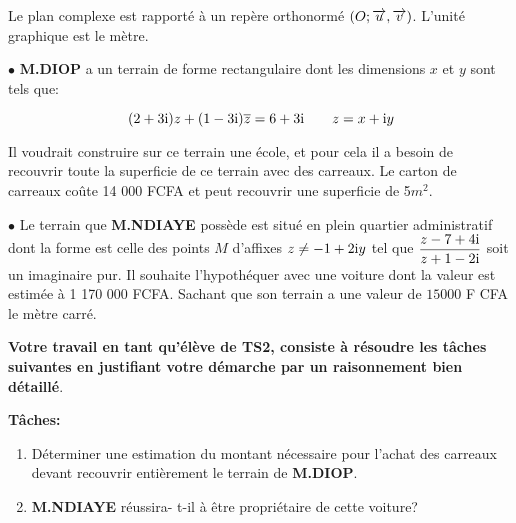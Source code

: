\begin{exercice}
Le plan complexe est rapporté à un repère  orthonormé $ (O ;\overrightarrow{u},\overrightarrow{v}) $. L'unité graphique est le mètre.
\medskip

$ \bullet $  \textbf{M.DIOP} a un terrain de forme rectangulaire  dont les dimensions $x$ et $y$ sont tels que:
\medskip

 $\hspace*{3cm} (2+3\i)z+(1-3\i)\overline{z} =6+3\i \qquad z=x+\i y $ 

\medskip

 Il voudrait construire sur ce terrain une école, et pour cela il a besoin de recouvrir  toute la superficie de ce terrain avec des carreaux. Le carton de carreaux coûte 14 000 FCFA et peut recouvrir une superficie de 5$m^2$.


\medskip


$ \bullet $ Le terrain que  \textbf{M.NDIAYE}  possède est situé en plein  quartier administratif  dont la forme est celle des points $ M $ d'affixes $ z\neq -1+2\text{i} y $ tel que \; $ \dfrac{z-7+4\text{i}}{z+1-2\text{i}}$ soit un imaginaire pur. Il souhaite l'hypothéquer  avec une voiture dont la valeur est estimée à 1 170 000 FCFA. Sachant que son terrain a une valeur de $ 15000$  F CFA le mètre carré.

\medskip

\textbf{Votre travail en tant qu'élève de TS2, consiste à résoudre les tâches suivantes en justifiant votre démarche par un raisonnement bien détaillé}.

\medskip

\textbf{Tâches:}
\begin{enumerate}
\item Déterminer une estimation du montant nécessaire pour l'achat des carreaux devant recouvrir entièrement le terrain de  \textbf{M.DIOP}.
\item \textbf{M.NDIAYE}  réussira- t-il à être propriétaire de cette voiture? 
\end{enumerate}
\end{exercice}


